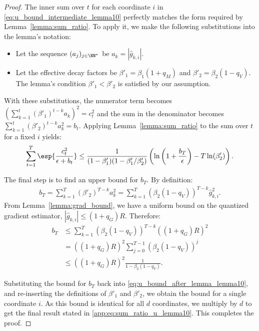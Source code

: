 \documentclass[11pt, letterpaper]{article}
\begin{document}
\begin{proof}
The inner sum over $t$ for each coordinate $i$ in \eqref{eq:u_bound_intermediate_lemma10} perfectly matches the form required by Lemma~\ref{lemma:sum_ratio}. To apply it, we make the following substitutions into the lemma's notation:
\begin{itemize}[leftmargin=*]
    \item Let the sequence $(a_j)_{j\in\NN^*}$ be $a_k = |\hat{g}_{k,i}|$.
    \item Let the effective decay factors be $\beta'_1 = \beta_1(1+q_M)$ and $\beta'_2 = \beta_2(1-q_V)$. The lemma's condition $\beta'_1 < \beta'_2$ is satisfied by our assumption.
\end{itemize}
With these substitutions, the numerator term becomes $\left(\sum_{k=1}^t (\beta'_1)^{t-k} a_k\right)^2 = c_t^2$ and the sum in the denominator becomes $\sum_{k=1}^t (\beta'_2)^{t-k} a_k^2 = b_t$. Applying Lemma~\ref{lemma:sum_ratio} to the sum over $t$ for a fixed $i$ yields:
\begin{align}
\label{eq:u_bound_after_lemma_lemma10}
    \sum_{t=1}^T \esp{\frac{c_t^2}{\epsilon+b_t}} \le \frac{1}{(1 - \beta'_1)(1 - \beta'_1/\beta'_2)} \left( \ln\left(1 + \frac{b_T}{\epsilon}\right) - T\ln(\beta'_2) \right).
\end{align}

The final step is to find an upper bound for $b_T$. By definition:
\begin{align}
    b_T = \sum_{k=1}^T (\beta'_2)^{T-k} a_k^2 = \sum_{k=1}^T (\beta_2(1-q_V))^{T-k} \hat{g}_{k,i}^2.
\end{align}
From Lemma~\ref{lemma:grad_bound}, we have a uniform bound on the quantized gradient estimator, $|\hat{g}_{k,i}| \le (1+q_G)R$. Therefore:
\begin{align}
    b_T &\le \sum_{k=1}^T (\beta_2(1-q_V))^{T-k} ((1+q_G)R)^2 \nonumber \\
    &= ((1+q_G)R)^2 \sum_{j=0}^{T-1} (\beta_2(1-q_V))^{j} \nonumber \\
    &\le ((1+q_G)R)^2 \frac{1}{1 - \beta_2(1-q_V)}.
\end{align}

Substituting the bound for $b_T$ back into \eqref{eq:u_bound_after_lemma_lemma10}, and re-inserting the definitions of $\beta'_1$ and $\beta'_2$, we obtain the bound for a single coordinate $i$. As this bound is identical for all $d$ coordinates, we multiply by $d$ to get the final result stated in \eqref{app:eq:sum_ratio_u_lemma10}. This completes the proof.
\end{proof}
\end{document}
